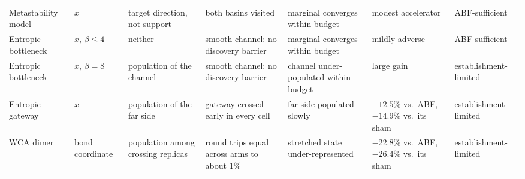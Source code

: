 \begin{table}[p]
\begin{tabular}{R{1.9cm}R{1.3cm}R{2.2cm}R{2.5cm}R{2.45cm}R{2.2cm}R{2.15cm}}
Metastability model & $x$ & target direction, not support & both basins visited & marginal converges within budget & modest accelerator & ABF-sufficient \\
Entropic bottleneck & $x$, $\beta\!\leq\!4$ & neither & smooth channel: no discovery barrier & marginal converges within budget & mildly adverse & ABF-sufficient \\
\midrule
Entropic bottleneck & $x$, $\beta\!=\!8$ & population of the channel & smooth channel: no discovery barrier & channel under-populated within budget & large gain & establishment-limited \\
Entropic gateway & $x$ & population of the far side & gateway crossed early in every cell & far side populated slowly & $-12.5\%$ vs.\ ABF, $-14.9\%$ vs.\ its sham & establishment-limited \\
WCA dimer & bond coordinate & population among crossing replicas & round trips equal across arms to about 1\% & stretched state under-represented & $-22.8\%$ vs.\ ABF, $-26.4\%$ vs.\ its sham & establishment-limited \\
\bottomrule
\end{tabular}
\end{table}
